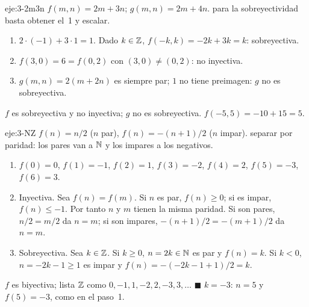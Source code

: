 \begin{solucion}{eje:3-2m3n}
\datos $f(m,n)=2m+3n$; $g(m,n)=2m+4n$.
\planteamiento para la sobreyectividad basta obtener el~1 y escalar.
\pasos
\begin{enumerate}[label=\arabic*.]
  \item $2\cdot(-1)+3\cdot1=1$. Dado $k\in\mathbb{Z}$, $f(-k,k)=-2k+3k=k$: sobreyectiva.
  \item $f(3,0)=6=f(0,2)$ con $(3,0)\neq(0,2)$: no inyectiva.
  \item $g(m,n)=2(m+2n)$ es siempre par; $1$ no tiene preimagen: $g$ no es sobreyectiva.
\end{enumerate}
\resultado $f$ es sobreyectiva y no inyectiva; $g$ no es sobreyectiva.
\comprobacion $f(-5,5)=-10+15=5$.
\end{solucion}

\begin{solucion}{eje:3-NZ}
\datos $f(n)=n/2$ ($n$ par), $f(n)=-(n+1)/2$ ($n$ impar).
\planteamiento separar por paridad: los pares van a $\mathbb{N}$ y los impares a los negativos.
\pasos
\begin{enumerate}[label=\arabic*.]
  \item $f(0)=0$, $f(1)=-1$, $f(2)=1$, $f(3)=-2$, $f(4)=2$, $f(5)=-3$, $f(6)=3$.
  \item Inyectiva. Sea $f(n)=f(m)$. Si $n$ es par, $f(n)\ge0$; si es impar, $f(n)\le-1$. Por tanto $n$ y $m$ tienen la misma paridad. Si son pares, $n/2=m/2$ da $n=m$; si son impares, $-(n+1)/2=-(m+1)/2$ da $n=m$.
  \item Sobreyectiva. Sea $k\in\mathbb{Z}$. Si $k\ge0$, $n=2k\in\mathbb{N}$ es par y $f(n)=k$. Si $k<0$, $n=-2k-1\ge1$ es impar y $f(n)=-(-2k-1+1)/2=k$.
\end{enumerate}
\resultado $f$ es biyectiva; lista $\mathbb{Z}$ como $0,-1,1,-2,2,-3,3,\dots$ \hfill$\blacksquare$
\comprobacion $k=-3$: $n=5$ y $f(5)=-3$, como en el paso~1.
\end{solucion}

